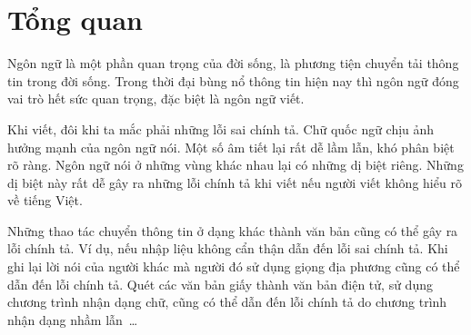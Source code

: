 \documentclass[a4paper,oneside,14pt]{extbook} %
\begin{document}



























\chapter{Tổng quan}
\label{cha:overview}
\minitoc


Ngôn ngữ là một phần quan trọng của đời sống, là phương tiện chuyển
tải thông tin trong đời sống. Trong thời đại bùng nổ thông tin hiện
nay thì ngôn ngữ đóng vai trò hết sức quan trọng, đặc biệt là ngôn ngữ
viết. 

Khi viết, đôi khi ta mắc phải những lỗi sai chính tả. Chữ quốc ngữ
chịu ảnh hưởng mạnh của ngôn ngữ nói. Một số âm tiết lại rất dễ 
lầm lẫn, khó phân biệt rõ ràng. Ngôn ngữ nói ở những vùng khác nhau lại
có những dị biệt riêng. Những dị biệt này rất dễ gây ra
những lỗi chính tả khi viết nếu người viết không hiểu rõ về tiếng
Việt.

Những thao tác chuyển thông tin ở dạng khác thành văn bản cũng có thể
gây ra lỗi chính tả. Ví dụ, nếu nhập liệu không cẩn thận dẫn đến lỗi
sai chính tả. Khi ghi lại lời nói của người khác mà người đó sử dụng
giọng địa phương cũng có thể dẫn đến lỗi chính tả. Quét các văn bản
giấy thành văn bản điện tử, sử dụng chương trình nhận dạng chữ, cũng
có thể dẫn đến lỗi chính tả do chương trình nhận dạng nhầm lẫn~\ldots{}
\end{document}
